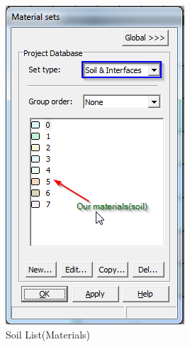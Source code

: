 \begin{landscape}
\begin{figure}[hbtp]
  \centering
  \hfill
  \begin{minipage}[c]{0.4\linewidth}
  \includegraphics[width=\linewidth, height=0.9\textheight,keepaspectratio]{images/plx/a (3).png}
  \caption{Soil List(Materials)}
  \end{minipage}
  \hfill
  \begin{minipage}[c]{0.4\linewidth}

\end{minipage}
\end{figure}
\end{landscape}
